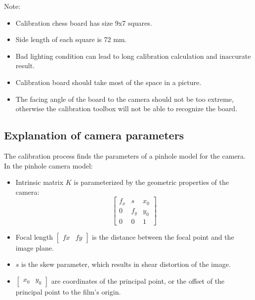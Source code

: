 \documentclass[paper=a4, fontsize=11pt]{scrartcl} %
\begin{document}
    Note:
    \begin{itemize}
        \item Calibration chess board has size 9x7 squares.
        \item Side length of each square is 72 mm.
        \item Bad lighting condition can lead to long calibration calculation and inaccurate result.
        \item Calibration board should take most of the space in a picture.
        \item The facing angle of the board to the camera should not be too extreme, otherwise the calibration toolbox will not be able to recognize the board.
    \end{itemize}

    \subsection{Explanation of camera parameters}
    The calibration process finds the parameters of a pinhole model for the camera. In the pinhole camera model:
    \begin{itemize}
        \item Intrinsic matrix $K$ is parameterized by the geometric properties of the camera:
        \[ \left[ \begin{matrix}
        f_x    & s      & x_0    \\
        0      & f_y    & y_0    \\
        0      & 0      & 1
        \end{matrix} \right] \]
        \item Focal length $\left[ \begin{matrix} fx & fy \end{matrix} \right]$ is the distance between the focal point and the image plane.
        \item $s$ is the skew parameter, which results in shear distortion of the image.
        \item $\left[ \begin{matrix} x_0 & y_0 \end{matrix} \right]$ are coordinates of the principal point, or the offset of the principal point to the film's origin.
    \end{itemize}
\end{document}
